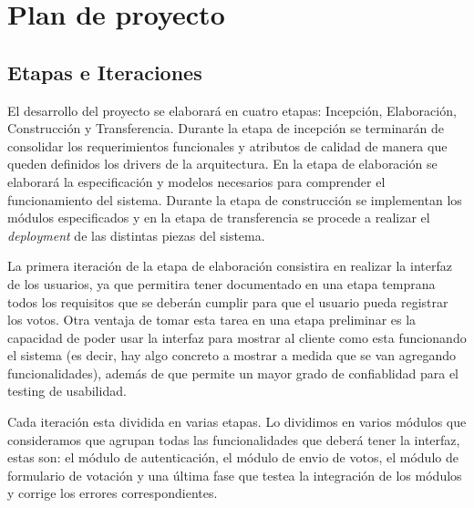 \section{Plan de proyecto}

\subsection{Etapas e Iteraciones}

El desarrollo del proyecto se elaborar\'a en cuatro etapas: Incepción, Elaboración, Construcción y Transferencia. Durante la etapa de incepción se terminar\'an de consolidar los requerimientos funcionales y atributos de calidad de manera que queden definidos los drivers de la arquitectura. En la etapa de elaboración se elaborar\'a la especificación y modelos necesarios para comprender el funcionamiento del sistema. Durante la etapa de construcción se implementan los m\'odulos especificados y en la etapa de transferencia se procede a realizar el \textit{deployment} de las distintas piezas del sistema.  
\\ \par

La primera iteración de la etapa de elaboración consistira en realizar la interfaz de los usuarios, ya que permitira tener documentado en una etapa temprana todos los requisitos que se deber\'an cumplir para que el usuario pueda registrar los votos. Otra ventaja de tomar esta tarea en una etapa preliminar es la capacidad de poder usar la interfaz para mostrar al cliente como esta funcionando el sistema (es decir, hay algo concreto a mostrar a medida que se van agregando funcionalidades), además de que permite un mayor grado de confiablidad para el testing de usabilidad. 
\\ \par
Cada iteración esta dividida en varias etapas. Lo dividimos en varios m\'odulos que consideramos que agrupan todas las funcionalidades que deber\'a tener la interfaz, estas son: el m\'odulo de autenticación, el m\'odulo de envio de votos, el m\'odulo de formulario de votaci\'on y una \'ultima fase que testea la integraci\'on de los m\'odulos y corrige los errores correspondientes.

